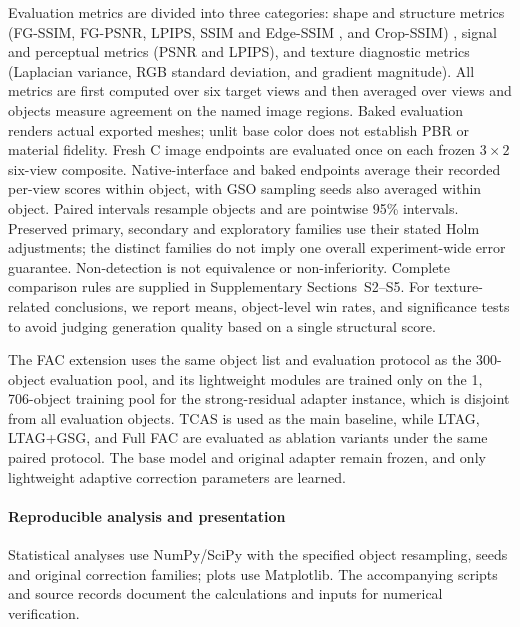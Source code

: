 \documentclass[times,twocolumn,final]{elsarticle}
\providecommand{\DIFadd}[1]{{\protect\color{blue} \sf #1}} %
\providecommand{\DIFdel}[1]{{\protect\color{red} \scriptsize #1}} %
\providecommand{\DIFaddbegin}{} %
\providecommand{\DIFaddend}{} %
\providecommand{\DIFdelbegin}{} %
\providecommand{\DIFdelend}{} %
\begin{document}
\DIFdelbegin \DIFdel{Evaluation metrics are divided into three categories: shape and structure metrics (FG-SSIM, }\DIFdelend \DIFaddbegin \DIFadd{FG-PSNR, LPIPS, SSIM and }\DIFaddend Edge-SSIM \DIFdelbegin \DIFdel{, and Crop-SSIM) , signal and perceptual metrics (PSNR and LPIPS), and texture diagnostic metrics (Laplacian variance, RGB standard deviation, and gradient magnitude). All metrics are first computed over six target views and then averaged over views and objects }\DIFdelend \DIFaddbegin \DIFadd{measure agreement on the named image regions. Baked evaluation renders actual exported meshes; unlit base color does not establish PBR or material fidelity. Fresh C image endpoints are evaluated once on each frozen $3\times2$ six-view composite. Native-interface and baked endpoints average their recorded per-view scores within object, with GSO sampling seeds also averaged within object. Paired intervals resample objects and are pointwise 95\% intervals. Preserved primary, secondary and exploratory families use their stated Holm adjustments; the distinct families do not imply one overall experiment-wide error guarantee. Non-detection is not equivalence or non-inferiority. Complete comparison rules are supplied in Supplementary Sections~S2--S5}\DIFaddend .
\DIFdelbegin \DIFdel{For texture-related conclusions, we report means, object-level win rates, and significance tests to avoid judging generation quality based on a single structural score.
}\DIFdelend

\DIFdelbegin \DIFdel{The FAC extension uses the same object list and evaluation protocol as the 300-object evaluation pool, and its lightweight modules are trained only on the 1, 706-object training pool for the strong-residual adapter instance, which is disjoint from all evaluation objects. TCAS is used as the main baseline, while LTAG, LTAG+GSG, and Full FAC are evaluated as ablation variants under the same paired protocol. The base model and original adapter remain frozen, and only lightweight adaptive correction parameters are learned. }\DIFdelend \DIFaddbegin \paragraph{Reproducible analysis and presentation}
\DIFadd{Statistical analyses use NumPy/SciPy with the specified object resampling, seeds and original correction families; plots use Matplotlib. The accompanying scripts and source records document the calculations and inputs for numerical verification.
}\DIFaddend
\end{document}
